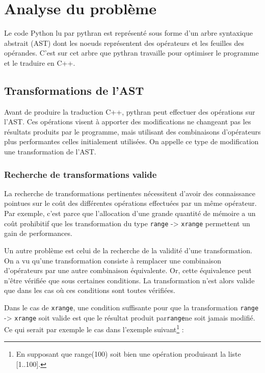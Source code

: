 \documentclass[a4paper]{article}
\begin{document}
\section{Analyse du problème}

Le code Python lu par pythran est représenté sous forme d'un arbre
syntaxique abstrait (AST) dont les noeuds représentent des opérateurs
et les feuilles des opérandes. C'est sur cet arbre que pythran
travaille pour optimiser le programme et le traduire en C++.

\subsection{Transformations de l'AST}

Avant de produire la traduction C++, pythran peut effectuer des
opérations sur l'AST. Ces opérations visent à apporter des
modifications ne changeant pas les résultats produits par le
programme, mais utilisant des combinaisons d'opérateurs plus
performantes celles initialement utilisées. On appelle ce type de
modification une transformation de l'AST.

\subsubsection{Recherche de transformations valide}

La recherche de transformations pertinentes nécessitent d'avoir des
connaissance pointues sur le coût des différentes opérations
effectuées par un même opérateur. Par exemple, c'est parce que
l'allocation d'une grande quantité de mémoire a un coût prohibitif que
les transformation du type \texttt{range} -> \texttt{xrange} permettent un gain de
performances.

Un autre problème est celui de la recherche de la validité d'une
transformation. On a vu qu'une transformation consiste à remplacer une
combinaison d'opérateurs par une autre combinaison équivalente. Or,
cette équivalence peut n'être vérifiée que sous certaines
conditions. La transformation n'est alors valide que dans les cas où
ces conditions sont toutes vérifiées.

Dans le cas de \texttt{xrange}, une condition suffisante pour que la
transformation \texttt{range} -> \texttt{xrange} soit valide est que le résultat produit
par\texttt{range}ne soit jamais modifié. Ce qui serait par exemple le cas
dans l'exemple suivant\footnote{En supposant que range(100) soit bien
  une opération produisant la liste [1..100].} :
\end{document}
